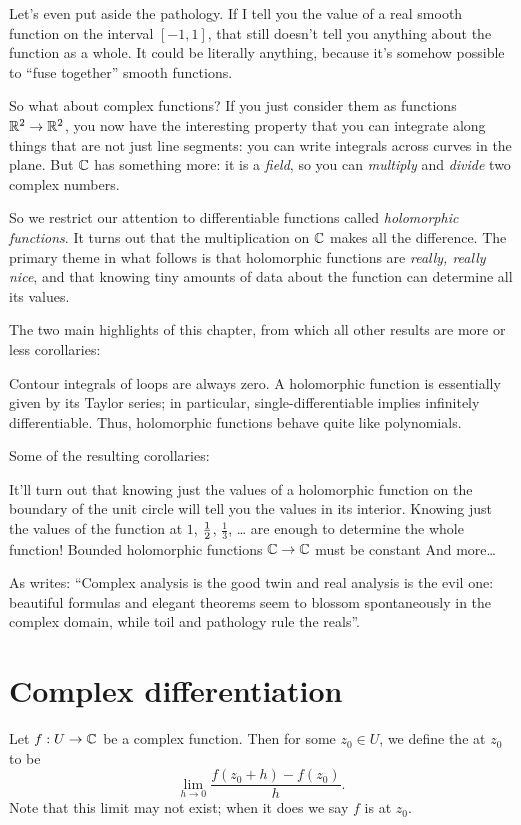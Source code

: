 Let's even put aside the pathology.
If I tell you the value of a real smooth function on the interval $[-1, 1]$,
that still doesn't tell you anything about the function as a whole.
It could be literally anything, because it's somehow possible to ``fuse together'' smooth functions.

So what about complex functions?
If you just consider them as functions $\mathbb R^2 \to \mathbb R^2$, you now have the interesting property
that you can integrate along things that are not just line segments: you can write integrals
across curves in the plane.
But $\mathbb C$ has something more: it is a \emph{field}, so you can \emph{multiply} and \emph{divide} two complex numbers.

So we restrict our attention to differentiable functions called \emph{holomorphic functions}.
It turns out that the multiplication on $\mathbb C$ makes all the difference.
The primary theme in what follows is that holomorphic functions are \emph{really, really nice},
and that knowing tiny amounts of data about the function can determine all its values.

The two main highlights of this chapter,
from which all other results are more or less corollaries:
\begin{itemize}
	\ii Contour integrals of loops are always zero.
	\ii A holomorphic function is essentially given by its Taylor series;
	in particular, single-differentiable implies infinitely differentiable.
	Thus, holomorphic functions behave quite like polynomials.
\end{itemize}
Some of the resulting corollaries:
\begin{itemize}
	\ii It'll turn out that knowing just the values of a holomorphic function
	on the boundary of the unit circle will tell you the values in its interior.
	\ii Knowing just the values of the function at $1$, $\frac{1}{2}$, $\frac13$, \dots
	are enough to determine the whole function!
	\ii Bounded holomorphic functions $\mathbb C \to \mathbb C$ must be constant
	\ii And more\dots
\end{itemize}

As \cite{ref:pugh} writes: ``Complex analysis is the good twin and real analysis is the evil one: beautiful formulas and elegant theorems seem to blossom spontaneously in the complex domain, while toil and pathology rule the reals''.


\section{Complex differentiation}
Let $f : U \to \mathbb C$ be a complex function.
Then for some $z_0 \in U$, we define the  at $z_0$ to be
\[
	\lim_{h \to 0} \frac{f(z_0+h) - f(z_0)}{h}.
\]
Note that this limit may not exist; when it does we say $f$ is  at $z_0$.

